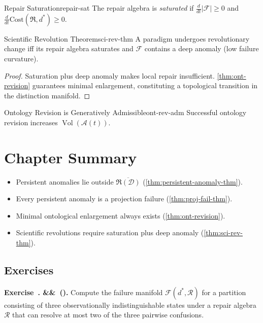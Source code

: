 \documentclass[12pt,twoside,openright]{book}
\newcommand{\adm}{\mathcal{A}}
\newcommand{\repair}{\mathfrak{R}}
\newcommand{\Vol}{\operatorname{Vol}}
\newenvironment{chapsummary}{%
  \begin{tcolorbox}[colback=DistBlue!5,colframe=DistBlue,
    title={\faBookOpen\enspace Summary},
    fonttitle=\sffamily\bfseries\color{white},
    attach boxed title to top left={yshift=-2mm,xshift=4mm},
    boxed title style={colback=DistBlue,rounded corners}]
  \begin{itemize}[nosep,leftmargin=*]}{%
  \end{itemize}\end{tcolorbox}}
\newcounter{exercise}[chapter]
\newenvironment{exercise}[1][]{%
  \refstepcounter{exercise}%
  \noindent\textbf{\sffamily\color{DistBlue}%
  Exercise~\thechapter.\theexercise%
  \ifx&#1&\else~(#1)\fi.}\enspace}{\par\medskip}
\begin{document}
\begin{definition}{Repair Saturation}{repair-sat}
  The repair algebra is \emph{saturated} if
  $\frac{d}{dt}|\mathcal{F}|\ge0$ and
  $\frac{d}{dt}\mathrm{Cost}(\repair,d^*)\ge0$.
\end{definition}

\begin{theorem}{Scientific Revolution Theorem}{sci-rev-thm}
  A paradigm undergoes revolutionary change iff its repair
  algebra saturates and $\mathcal{F}$ contains a deep
  anomaly (low failure curvature).
  \parencite{kuhn1962structure,lakatos1978}
\end{theorem}
\begin{proof}
  Saturation plus deep anomaly makes local repair
  insufficient. \cref{thm:ont-revision} guarantees
  minimal enlargement, constituting a topological
  transition in the distinction manifold.
\end{proof}

\begin{corollary}{Ontology Revision is Generatively
  Admissible}{ont-rev-adm}
  Successful ontology revision increases $\Vol(\adm(t))$.
\end{corollary}

\section*{Chapter Summary}
\begin{chapsummary}
  \item Persistent anomalies lie outside
        $\overline{\repair(\mathcal{D})}$
        (\cref{thm:persistent-anomaly-thm}).
  \item Every persistent anomaly is a projection failure
        (\cref{thm:proj-fail-thm}).
  \item Minimal ontological enlargement always exists
        (\cref{thm:ont-revision}).
  \item Scientific revolutions require saturation plus deep
        anomaly (\cref{thm:sci-rev-thm}).
\end{chapsummary}

\subsection*{Exercises}

\begin{exercise}
  Compute the failure manifold $\mathcal{F}(d^*,\mathcal{R})$
  for a partition consisting of three observationally
  indistinguishable states under a repair algebra
  $\mathcal{R}$ that can resolve at most two of the three
  pairwise confusions.
\end{exercise}
\end{document}
